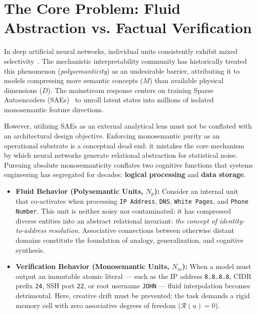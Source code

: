 \documentclass[11pt,a4paper]{article}
\theoremstyle{definition}
\begin{document}
\section{The Core Problem: Fluid Abstraction vs. Factual Verification}

In deep artificial neural networks, individual units consistently exhibit mixed selectivity~\cite{rigotti2013importance, fusi2016why, elhage2022toy}. The mechanistic interpretability community has historically treated this phenomenon (\textit{polysemanticity}) as an undesirable barrier, attributing it to models compressing more semantic concepts ($M$) than available physical dimensions ($D$). The mainstream response centers on training Sparse Autoencoders (SAEs)~\cite{bricken2023monosemanticity, templeton2024scaling} to unroll latent states into millions of isolated monosemantic feature directions.

However, utilizing SAEs as an external analytical lens must not be conflated with an architectural design objective. Enforcing monosemantic purity as an operational substrate is a conceptual dead end: it mistakes the core mechanism by which neural networks generate relational abstraction for statistical noise. Pursuing absolute monosemanticity conflates two cognitive functions that systems engineering has segregated for decades: \textbf{logical processing} and \textbf{data storage}.

\begin{itemize}[leftmargin=*, itemsep=2.5pt, topsep=3.0pt]
    \item \textbf{Fluid Behavior (Polysemantic Units, $N_p$):} Consider an internal unit that co-activates when processing \texttt{IP Address}, \texttt{DNS}, \texttt{White Pages}, and \texttt{Phone Number}. This unit is neither noisy nor contaminated: it has compressed diverse entities into an abstract relational invariant: \textit{the concept of identity-to-address resolution}. Associative connections between otherwise distant domains constitute the foundation of analogy, generalization, and cognitive synthesis.
    \item \textbf{Verification Behavior (Monosemantic Units, $N_m$):} When a model must output an immutable atomic literal — such as the IP address \texttt{8.8.8.8}, CIDR prefix \texttt{24}, SSH port \texttt{22}, or root username \texttt{JOHN} — fluid interpolation becomes detrimental. Here, creative drift must be prevented: the task demands a rigid memory cell with zero associative degrees of freedom ($\mathcal{R}(u)=0$).
\end{itemize}
\end{document}
